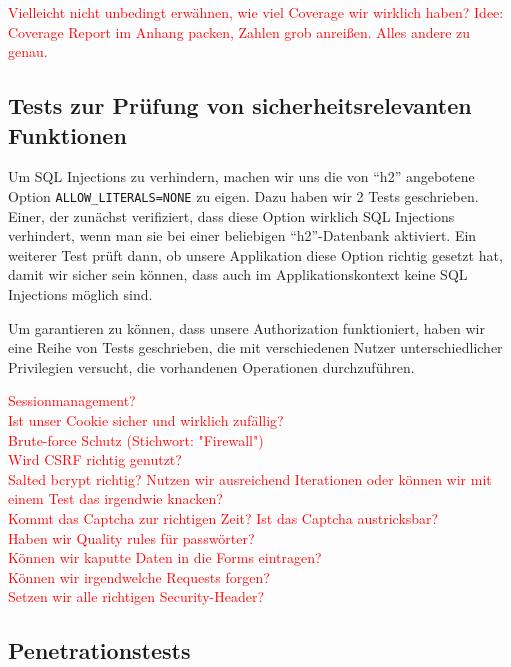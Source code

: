 \documentclass[12pt,DIV14,BCOR10mm,a4paper,parskip=half-,headsepline,headinclude,english,ngerman,bibliography=totocnumbered]{scrreprt}
\begin{document}
\textcolor{red}{
Vielleicht nicht unbedingt erwähnen, wie viel Coverage wir wirklich haben?
Idee: Coverage Report im Anhang packen, Zahlen grob anreißen. Alles andere zu genau.
}

\subsection{Tests zur Prüfung von sicherheitsrelevanten Funktionen}

Um SQL Injections zu verhindern, machen wir uns die von \enquote{h2} angebotene Option \texttt{ALLOW\_LITERALS=NONE} zu eigen.
Dazu haben wir 2 Tests geschrieben.
Einer, der zunächst verifiziert, dass diese Option wirklich SQL Injections verhindert, wenn man sie bei einer beliebigen \enquote{h2}-Datenbank aktiviert.
Ein weiterer Test prüft dann, ob unsere Applikation diese Option richtig gesetzt hat, damit wir sicher sein können, dass auch im Applikationskontext keine SQL Injections möglich sind.

Um garantieren zu können, dass unsere Authorization funktioniert, haben wir eine Reihe von Tests geschrieben, die mit verschiedenen Nutzer unterschiedlicher Privilegien versucht, die vorhandenen Operationen durchzuführen.

\textcolor{red}{
Sessionmanagement? \\
Ist unser Cookie sicher und wirklich zufällig? \\
Brute-force Schutz (Stichwort: "Firewall") \\
Wird CSRF richtig genutzt? \\
Salted bcrypt richtig? Nutzen wir ausreichend Iterationen oder können wir mit einem Test das irgendwie knacken? \\
Kommt das Captcha zur richtigen Zeit? Ist das Captcha austricksbar? \\
Haben wir Quality rules für passwörter? \\
Können wir kaputte Daten in die Forms eintragen? \\
Können wir irgendwelche Requests forgen? \\
Setzen wir alle richtigen Security-Header? \\
}

\subsection{Penetrationstests}
\end{document}
